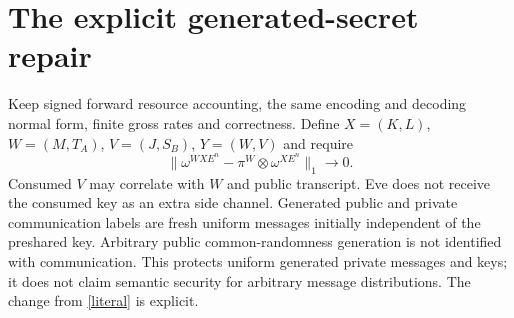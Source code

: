 \documentclass[11pt]{article}
\begin{document}
\section{The explicit generated-secret repair}
Keep signed forward resource accounting, the same encoding and decoding
normal form, finite gross rates and correctness. Define
$X=(K,L)$, $W=(M,T_A)$, $V=(J,S_B)$, $Y=(W,V)$ and require
\begin{equation}\label{gen}
 \|\omega^{W X E^n}-\pi^W\otimes\omega^{X E^n}\|_1\longrightarrow0.
\end{equation}
Consumed $V$ may correlate with $W$ and public transcript.
Eve does not receive the consumed key as an extra side channel.
Generated public and private communication labels are fresh uniform
messages initially independent of the preshared key. Arbitrary public
common-randomness generation is not identified with communication.
This protects uniform generated private messages and keys;
it does not claim semantic security for arbitrary message
distributions. The change from \eqref{literal} is explicit.
\end{document}
